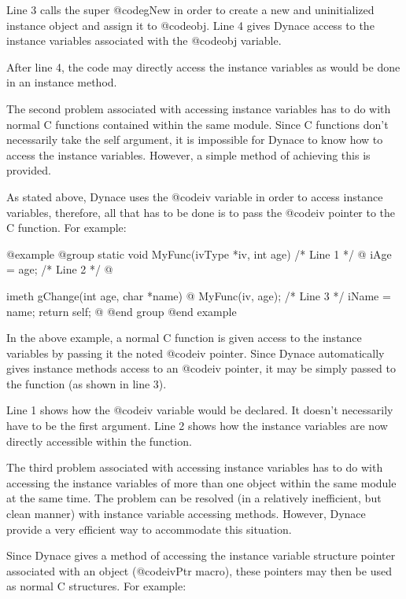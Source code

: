 Line 3 calls the super @code{gNew} in order to create a new and
uninitialized instance object and assign it to @code{obj}.  Line 4
gives Dynace access to the instance variables associated with the
@code{obj} variable.

After line 4, the code may directly access the instance variables
as would be done in an instance method.

The second problem associated with accessing instance variables has
to do with normal C functions contained within the same module.
Since C functions don't necessarily take the self argument, it is
impossible for Dynace to know how to access the instance variables.
However, a simple method of achieving this is provided.

As stated above, Dynace uses the @code{iv} variable in order to
access instance variables, therefore, all that has to be done is
to pass the @code{iv} pointer to the C function.  For example:

@example
@group
static  void    MyFunc(ivType *iv, int age)     /*  Line 1  */
@{
        iAge = age;                             /*  Line 2  */
@}

imeth   gChange(int age, char *name)
@{
        MyFunc(iv, age);                        /*  Line 3  */
        iName = name;
        return self;
@}
@end group
@end example

In the above example, a normal C function is given access to the
instance variables by passing it the noted @code{iv} pointer.
Since Dynace automatically gives instance methods access to an
@code{iv} pointer, it may be simply passed to the function
(as shown in line 3).

Line 1 shows how the @code{iv} variable would be declared.  It doesn't
necessarily have to be the first argument.  Line 2 shows how the
instance variables are now directly accessible within the function.

The third problem associated with accessing instance variables has to do
with accessing the instance variables of more than one object within the
same module at the same time.  The problem can be resolved (in a relatively
inefficient, but clean manner) with instance variable accessing methods.
However, Dynace provide a very efficient way to accommodate this situation.

Since Dynace gives a method of accessing the instance variable
structure pointer associated with an object (@code{ivPtr} macro), these
pointers may then be used as normal C structures.  For example:

